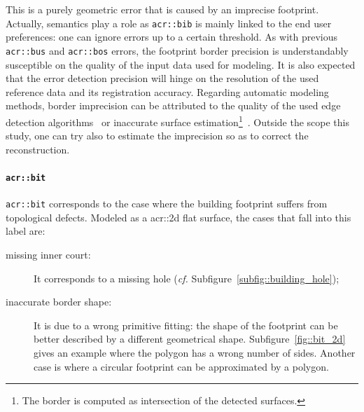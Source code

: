                 This is a purely geometric error that is caused by an imprecise footprint.
                Actually, semantics play a role as \texttt{\gls{acr::bib}} is mainly linked to the end user preferences: one can ignore errors up to a certain threshold. 
                As with previous \texttt{\gls{acr::bus}} and \texttt{\gls{acr::bos}} errors, the footprint border precision is understandably susceptible on the quality of the input data used for modeling.
                It is also expected that the error detection precision will hinge on the resolution of the used reference data and its registration accuracy.
                Regarding automatic modeling methods, border imprecision can be attributed to the quality of the used edge detection algorithms~\parencite{baillard1999automatic,werner2002new,nan2015template} or inaccurate surface estimation\footnote{
                    The border is computed as intersection of the detected surfaces.
                }~\parencite{durupt2006automatic,xiong2014graph}.
                Outside the scope this study, one can try also to estimate the imprecision so as to correct the reconstruction.

            \paragraph{\texttt{\acrlong*{acr::bit}}}
                \texttt{\gls{acr::bit}} corresponds to the case where the building footprint suffers from topological defects.
                Modeled as a \gls{acr::2d} flat surface, the cases that fall into this label are:
                \begin{description}
                    \item[missing inner court:] It corresponds to a missing hole (\textit{cf.} Subfigure~\ref{subfig::building_hole});
                    \item[inaccurate border shape:] It is due to a wrong primitive fitting: the shape of the footprint can be better described by a different geometrical shape.
                            Subfigure~\ref{fig::bit_2d} gives an example where the polygon has a wrong number of sides.
                            Another case is where a circular footprint can be approximated by a polygon.
                \end{description}

